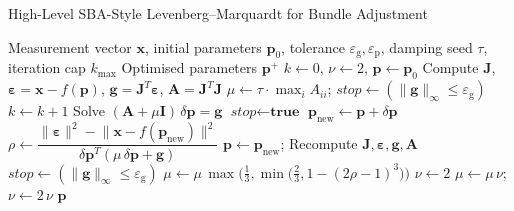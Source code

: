 \begin{algorithm}[t]
  \caption{High-Level SBA-Style Levenberg--Marquardt for Bundle Adjustment}
  \label{alg:lm}
  \begin{algorithmic}[1]
    \Require Measurement vector $\mathbf{x}$, initial parameters $\mathbf{p}_0$, tolerance $\varepsilon_{\mathrm{g}},\varepsilon_{\mathrm{p}}$, damping seed $\tau$, iteration cap $k_{\max}$
    \Ensure Optimised parameters $\mathbf{p}^{+}$
    \State $k \gets 0$, $\nu \gets 2$, $\mathbf{p} \gets \mathbf{p}_0$
    \State Compute $\mathbf{J}$, $\boldsymbol{\varepsilon}=\mathbf{x}-f(\mathbf{p})$, $\mathbf{g}=\mathbf{J}^{T}\boldsymbol{\varepsilon}$, $\mathbf{A}=\mathbf{J}^{T}\mathbf{J}$
    \State $\mu \gets \tau \cdot \max_i A_{ii}$; $\textit{stop} \gets (\lVert \mathbf{g} \rVert_\infty \le \varepsilon_{\mathrm{g}})$
      \State $k \gets k+1$
      \Repeat
        \State Solve $(\mathbf{A}+\mu\mathbf{I})\,\delta\mathbf{p}=\mathbf{g}$ \hspace{-1em} 
          \State $\textit{stop} \gets \textbf{true}$
        \Else
          \State $\mathbf{p}_{\text{new}} \gets \mathbf{p}+\delta\mathbf{p}$
          \State $\rho \gets \dfrac{\lVert\boldsymbol{\varepsilon}\rVert^{2}-\lVert \mathbf{x}-f(\mathbf{p}_{\text{new}}) \rVert^{2}}{\delta\mathbf{p}^{T}(\mu\,\delta\mathbf{p}+\mathbf{g})}$
            \State $\mathbf{p} \gets \mathbf{p}_{\text{new}}$; Recompute $\mathbf{J},\boldsymbol{\varepsilon},\mathbf{g},\mathbf{A}$
            \State $\textit{stop} \gets (\lVert \mathbf{g} \rVert_\infty \le \varepsilon_{\mathrm{g}})$
            \State $\mu \gets \mu\,\max\bigl(\tfrac13, \min\bigl(\tfrac23, 1-(2\rho-1)^{3}\bigr)\bigr)$ 
            \State $\nu \gets 2$
          \Else
            \State $\mu \gets \mu\,\nu$; $\nu \gets 2\,\nu$
          \EndIf
        \EndIf
    \EndWhile
    \State \Return $\mathbf{p}$
  \end{algorithmic}
\end{algorithm}

